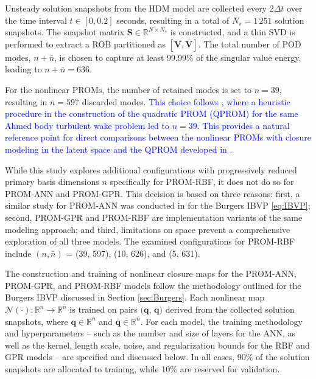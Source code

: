 \documentclass[preprint,10pt]{elsarticle}
\begin{document}
Unsteady solution snapshots from the HDM model are collected every $2\Delta t$ over the time interval $t \in [0, 0.2]$ seconds, resulting in a total of $N_s = 1\,251$ solution
snapshots. 
The snapshot matrix $\mathbf{S} \in \mathbb{R}^{N \times N_s}$ is constructed, and a thin SVD is performed to extract a ROB partitioned as $[\mathbf{V}, \mathbf{\overline{V}}]$. 
The total number of POD modes, $n + \bar{n}$, is chosen to capture at least 99.99\% of the singular value energy, leading to $n + \bar{n} = 636$.

For the nonlinear PROMs, the number of retained modes is set to $n = 39$, resulting in $\bar{n} = 597$ discarded modes. 
\textcolor{blue}{This choice follows \cite{barnett2022quadratic}, where a heuristic procedure in the construction of the quadratic PROM (QPROM) for the same Ahmed body turbulent wake problem led to $n=39$. 
This provides a natural reference point for direct comparisons between the nonlinear PROMs with closure modeling in the latent space and the QPROM developed in \cite{barnett2022quadratic}}.

While this study explores additional configurations with progressively reduced primary basis dimensions $n$ specifically for PROM-RBF, it does not do so for PROM-ANN and PROM-GPR. This decision is based on three reasons: first, a similar study for PROM-ANN was conducted in \cite{barnett2023neural} for the Burgers IBVP \eqref{eq:IBVP}; second, PROM-GPR and PROM-RBF are implementation variants of the same modeling approach; and third, limitations on space prevent a comprehensive exploration of all three models. The examined configurations for PROM-RBF include $(n, \bar{n})$ = (39, 597), (10, 626), and (5, 631).

The construction and training of nonlinear closure maps for the PROM-ANN, PROM-GPR, and PROM-RBF models follow the methodology outlined for the Burgers IBVP discussed in Section \ref{sec:Burgers}. Each nonlinear map $\mathcal{N}(\cdot): \mathbb{R}^n \to \mathbb{R}^{\bar{n}}$ is trained on pairs $(\mathbf{q}$, $\overline{\mathbf{q}})$ derived from the collected 
solution snapshots, where $\mathbf{q} \in \mathbb{R}^n$ and $\overline{\mathbf{q}} \in \mathbb{R}^{\bar{n}}$. For each model, the training methodology and hyperparameters -- such as the number and size of layers for the ANN, as well as the kernel, length scale, noise, and regularization bounds for the RBF and GPR models -- are specified and discussed below. In all cases, 90\% of the solution snapshots are allocated to training, while 10\% are reserved for validation.
\end{document}

